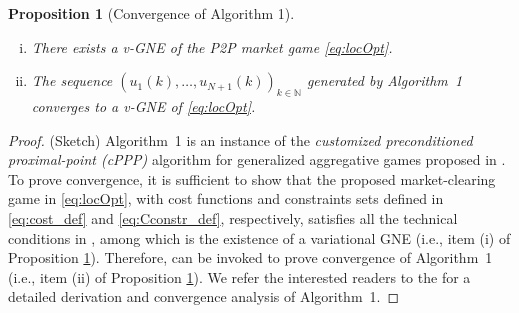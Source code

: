 \documentclass{IEEEtran}  %
\newtheorem{proposition}{Proposition}
\newcommand{\bb}{\mathbb}
\newcommand{\0}{\mathbf{0}}
\newcommand{\1}{\mathbf{1}}
\begin{document}
\smallskip
\begin{proposition}[Convergence of Algorithm 1]\hspace*{3em}
	\label{prp:conv}
\begin{enumerate}[(i)]
\item There exists a v-GNE of the P2P market game \eqref{eq:locOpt}.
\item The sequence $\left(u_1(k),\ldots,u_{N+1}(k)\right)_{k \in \bb N}$ generated by Algorithm~1 converges to a v-GNE of \eqref{eq:locOpt}.
\end{enumerate}
\end{proposition}
\begin{proof} (Sketch)
Algorithm~1 is an instance of the \textit{customized preconditioned proximal-point (cPPP)} algorithm for generalized aggregative games proposed in \cite[Algorithm~6]{belgioioso2020semi}. To prove convergence, it is sufficient to show that the proposed market-clearing game in \eqref{eq:locOpt}, with cost functions and constraints sets defined in \eqref{eq:cost_def} and \eqref{eq:Cconstr_def}, respectively, satisfies all the technical conditions in \cite[Theorem~2]{belgioioso2020semi}, among which is the existence of a variational GNE (i.e., item (i) of Proposition \ref{prp:conv}). Therefore, \cite[Theorem~2]{belgioioso2020semi} can be invoked to prove convergence of Algorithm~1 (i.e., item (ii) of Proposition \ref{prp:conv}).
We refer the interested readers to the \cite[Appendix~A]{belgioioso2021operationally} for a detailed derivation and convergence analysis of Algorithm~1.
\end{proof}
\end{document}
